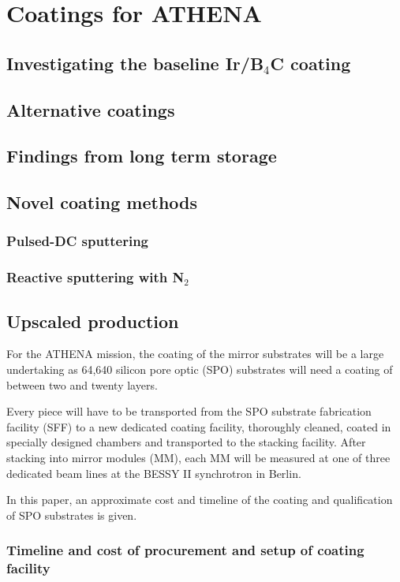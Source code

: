 \chapter{Coatings for ATHENA}

\section{Investigating the baseline Ir/B$_4$C coating}
\section{Alternative coatings}
\section{Findings from long term storage}
\section{Novel coating methods}
\subsection{Pulsed-DC sputtering}

\subsection{Reactive sputtering with N$_2$}

\section{Upscaled production}

For the ATHENA mission, the coating of the mirror substrates will be a large undertaking as 64,640 silicon pore optic (SPO) substrates will need a coating of between two and twenty layers.

Every piece will have to be transported from the SPO substrate fabrication facility (SFF) to a new dedicated coating facility, thoroughly cleaned, coated in specially designed chambers and transported to the stacking facility. After stacking into mirror modules (MM), each MM will be measured at one of three dedicated beam lines at the BESSY II synchrotron in Berlin.

In this paper, an approximate cost and timeline of the coating and qualification of SPO substrates is given.

\subsection{Timeline and cost of procurement and setup of coating facility}

